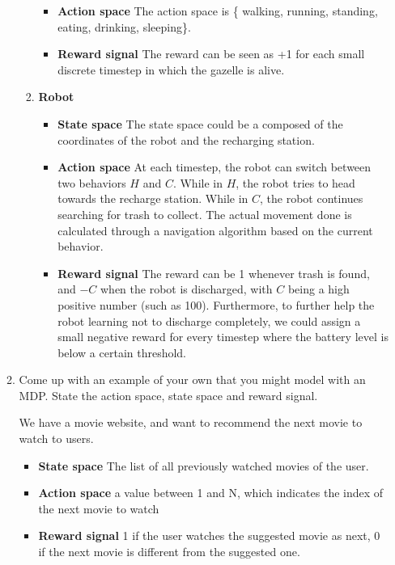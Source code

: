 \documentclass{exam}
\begin{document}
\begin{problem}
\begin{enumerate}
\begin{enumerate}
\begin{solutionorlines}[2in]
\begin{enumerate}
\begin{itemize}
        		\item \textbf{Action space} The action space is \{ walking, running, standing, eating, drinking, sleeping\}.
        		\item \textbf{Reward signal} The reward can be seen as +1 for each small discrete timestep in which the gazelle is alive.
        	\end{itemize}
        	\item \textbf{Robot}
        	\begin{itemize}
        		\item \textbf{State space} The state space could be a composed of the coordinates of the robot and the recharging station.
        		\item \textbf{Action space} At each timestep, the robot can switch between two behaviors $H$ and $C$. While in $H$, the robot tries to head towards the recharge station. While in $C$, the robot continues searching for trash to collect. The actual movement done is calculated through a navigation algorithm based on the current behavior.
        		\item \textbf{Reward signal} The reward can be 1 whenever trash is found, and $-C$ when the robot is discharged, with $C$ being a high positive number (such as 100). Furthermore, to further help the robot learning not to discharge completely, we could assign a small negative reward for every timestep where the battery level is below a certain threshold.
        	\end{itemize}
        \end{enumerate}
        \end{solutionorlines}
    \item Come up with an example of your own that you might model with an MDP. State the action space, state space and reward signal.
    \begin{solutionorlines}[2in]
        We have a movie website, and want to recommend the next movie to watch to users. 
        
        \begin{itemize}
            \item \textbf{State space} The list of all previously watched movies of the user.
            \item \textbf{Action space} a value between 1 and N, which indicates the index of the next movie to watch
            \item \textbf{Reward signal} 1 if the user watches the suggested movie as next, 0 if the next movie is different from the suggested one.
        \end{itemize}
    \end{solutionorlines}
    

\end{enumerate}
\end{enumerate}
\end{problem}
\end{document}
